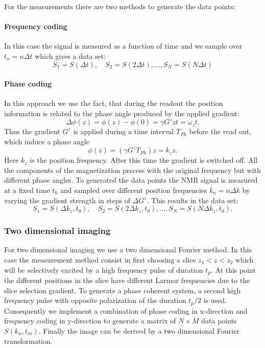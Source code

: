For the measurements there are two methods to generate the data points:
\paragraph{Frequency coding}
In this case the signal is measured as a function of time and we sample over $t_n = n\Delta t$ which gives a data set:
$$S_1 = S(\Delta t), \quad S_2 = S(2\Delta t), ..., S_N = S(N\Delta t)$$
\paragraph{Phase coding}
In this approach we use the fact, that during the readout the position information is related to the phase angle produced by the applied gradient:
\begin{equation}
\Delta \phi(z)= \phi(z)-\phi(0) = \gamma G^z z t= \omega_z t.
\end{equation}
Thus the gradient  $G^z$ is applied during a time interval $T_{Ph}$ before the read out, which induce a phase angle \begin{equation}
\phi(z) = (\gamma G^z T_{Ph})z = k_z z.
\end{equation}
Here $k_z$ is the position frequency. After this time the gradient is switched off. All the components of the magnetization precess with the original frequency but with different phase angles.  
To generated the data points the NMR signal is measured at a fixed time $t_0$ and sampled over different position frequencies $k_n = n\Delta k$ by varying the gradient strength in steps of $\Delta G^z$.  This results in the data set: 
$$S_1 = S(\Delta k_z,t_0), \quad S_2 = S(2\Delta k_z, t_0), ..., S_N = S(N\Delta k_z, t_0).$$

\subsubsection{Two dimensional imaging}
For two dimensional imaging we use a two dimensional Fourier method. In this case the measurement method consist in first choosing a slice $z_1 < z < z_2$ which will be selectively excited by a high frequency pulse of duration $t_p$. At this point the different positions in the slice have different Larmor frequencies due to the slice selection gradient. To generate a phase coherent system, a second high frequency pulse with opposite polarization of the duration $t_p/2$ is used. Consequently we implement a combination of phase coding in x-direction and frequency coding in y-direction to generate a matrix of $N\times M$ data points $S(k_n, t_m)$. Finally the image can be derived by a two dimensional Fourier transformation. 













